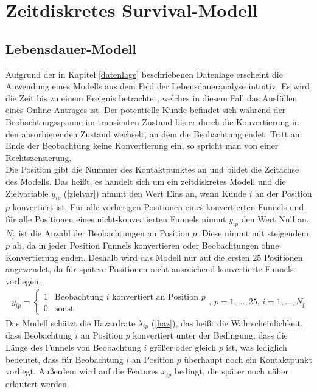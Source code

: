\section{Zeitdiskretes Survival-Modell}\label{survival}

\subsection{Lebensdauer-Modell}\label{secModel1}

Aufgrund der in Kapitel \ref{datenlage} beschriebenen Datenlage erscheint die Anwendung eines Modells aus dem Feld der Lebensdaueranalyse intuitiv. Es wird die Zeit bis zu einem Ereignis betrachtet, welches in diesem Fall das Ausfüllen eines Online-Antrages ist. Der potentielle Kunde befindet sich während der Beobachtungsspanne im transienten Zustand bis er durch die Konvertierung in den absorbierenden Zustand wechselt, an dem die Beobachtung endet. Tritt am Ende der Beobachtung keine Konvertierung ein, so spricht man von einer Rechtszensierung.\\
Die Position gibt die Nummer des Kontaktpunktes an und bildet die Zeitachse des Modells. Das heißt, es handelt sich um ein zeitdiskretes Modell und die Zielvariable $y_{ip}$ (\ref{zielvar}) nimmt den Wert Eins an, wenn Kunde $i$ an der Position $p$ konvertiert ist. Für alle vorherigen Positionen eines konvertierten Funnels und für alle Positionen eines nicht-konvertierten Funnels nimmt $y_{ip}$ den Wert Null an. $N_p$ ist die Anzahl der Beobachtungen an Position $p$. Diese nimmt mit steigendem $p$ ab, da in jeder Position Funnels konvertieren oder Beobachtungen ohne Konvertierung enden. Deshalb wird das Modell nur auf die ersten $25$ Positionen angewendet, da für spätere Positionen nicht ausreichend konvertierte Funnels vorliegen.\\
\begin{align}
	y_{ip} = \begin{cases} 1 & \text{Beobachtung } i \text{ konvertiert an Position } p\\
												 0 & \text{sonst} 
					 \end{cases} \text{, } p=1,...,25 \text{, } i=1,...,N_p \label{zielvar}
\end{align}
Das Modell schätzt die Hazardrate $\lambda_{ip}$ (\ref{haz}), das heißt die Wahrscheinlichkeit, dass Beobachtung $i$ an Position $p$ konvertiert unter der Bedingung, dass die Länge des Funnels von Beobachtung $i$ größer oder gleich $p$ ist, was lediglich bedeutet, dass für Beobachtung $i$ an Position $p$ überhaupt noch ein Kontaktpunkt vorliegt. Außerdem wird auf die Features $x_{ip}$ bedingt, die später noch näher erläutert werden.
